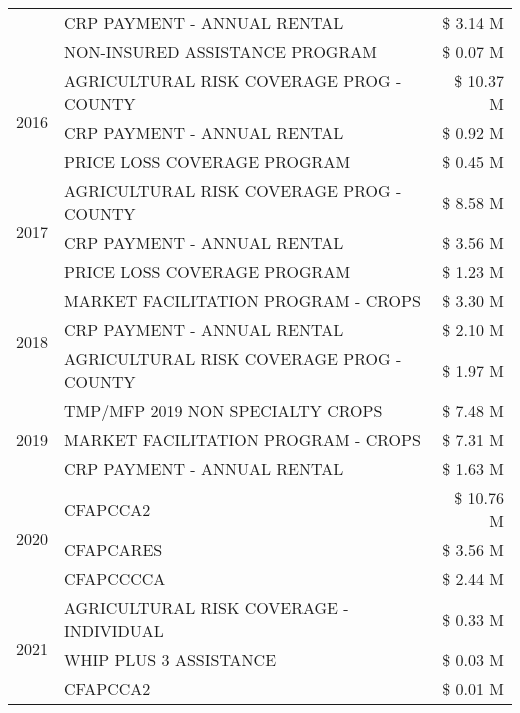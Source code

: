 \begin{tabular}{llr}
 & CRP PAYMENT - ANNUAL RENTAL & \$ 3.14 M \\
 & NON-INSURED ASSISTANCE PROGRAM & \$ 0.07 M \\
\cline{1-3}
\multirow[t]{3}{*}{2016} & AGRICULTURAL RISK COVERAGE PROG - COUNTY & \$ 10.37 M \\
 & CRP PAYMENT - ANNUAL RENTAL & \$ 0.92 M \\
 & PRICE LOSS COVERAGE PROGRAM & \$ 0.45 M \\
\cline{1-3}
\multirow[t]{3}{*}{2017} & AGRICULTURAL RISK COVERAGE PROG - COUNTY & \$ 8.58 M \\
 & CRP PAYMENT - ANNUAL RENTAL & \$ 3.56 M \\
 & PRICE LOSS COVERAGE PROGRAM & \$ 1.23 M \\
\cline{1-3}
\multirow[t]{3}{*}{2018} & MARKET FACILITATION PROGRAM - CROPS & \$ 3.30 M \\
 & CRP PAYMENT - ANNUAL RENTAL & \$ 2.10 M \\
 & AGRICULTURAL RISK COVERAGE PROG - COUNTY & \$ 1.97 M \\
\cline{1-3}
\multirow[t]{3}{*}{2019} & TMP/MFP 2019 NON SPECIALTY CROPS & \$ 7.48 M \\
 & MARKET FACILITATION PROGRAM - CROPS & \$ 7.31 M \\
 & CRP PAYMENT - ANNUAL RENTAL & \$ 1.63 M \\
\cline{1-3}
\multirow[t]{3}{*}{2020} & CFAPCCA2 & \$ 10.76 M \\
 & CFAPCARES & \$ 3.56 M \\
 & CFAPCCCCA & \$ 2.44 M \\
\cline{1-3}
\multirow[t]{3}{*}{2021} & AGRICULTURAL RISK COVERAGE - INDIVIDUAL & \$ 0.33 M \\
 & WHIP PLUS 3 ASSISTANCE & \$ 0.03 M \\
 & CFAPCCA2 & \$ 0.01 M \\
\cline{1-3}
\bottomrule
\end{tabular}
